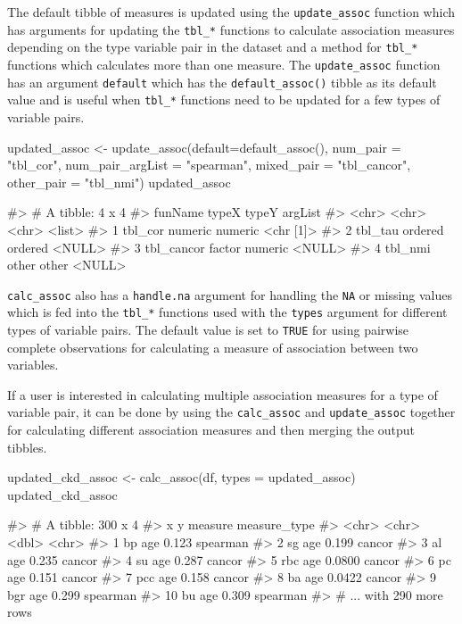 The default tibble of measures is updated using the
\texttt{update\_assoc} function which has arguments for updating the
\texttt{tbl\_*} functions to calculate association measures depending on
the type variable pair in the dataset and a method for \texttt{tbl\_*}
functions which calculates more than one measure. The
\texttt{update\_assoc} function has an argument \texttt{default} which
has the \texttt{default\_assoc()} tibble as its default value and is
useful when \texttt{tbl\_*} functions need to be updated for a few types
of variable pairs.

\begin{Schunk}
\begin{Sinput}
updated_assoc <- update_assoc(default=default_assoc(),
                              num_pair = "tbl_cor",
                              num_pair_argList = "spearman",
                              mixed_pair = "tbl_cancor",
                              other_pair = "tbl_nmi")
updated_assoc
\end{Sinput}
\begin{Soutput}
#> # A tibble: 4 x 4
#>   funName    typeX   typeY   argList  
#>   <chr>      <chr>   <chr>   <list>   
#> 1 tbl_cor    numeric numeric <chr [1]>
#> 2 tbl_tau    ordered ordered <NULL>   
#> 3 tbl_cancor factor  numeric <NULL>   
#> 4 tbl_nmi    other   other   <NULL>
\end{Soutput}
\end{Schunk}

\texttt{calc\_assoc} also has a \texttt{handle.na} argument for handling
the \texttt{NA} or missing values which is fed into the \texttt{tbl\_*}
functions used with the \texttt{types} argument for different types of
variable pairs. The default value is set to \texttt{TRUE} for using
pairwise complete observations for calculating a measure of association
between two variables.

If a user is interested in calculating multiple association measures for
a type of variable pair, it can be done by using the
\texttt{calc\_assoc} and \texttt{update\_assoc} together for calculating
different association measures and then merging the output tibbles.

\begin{Schunk}
\begin{Sinput}
updated_ckd_assoc <- calc_assoc(df, types = updated_assoc)
updated_ckd_assoc
\end{Sinput}
\begin{Soutput}
#> # A tibble: 300 x 4
#>    x     y     measure measure_type
#>    <chr> <chr>   <dbl> <chr>       
#>  1 bp    age    0.123  spearman    
#>  2 sg    age    0.199  cancor      
#>  3 al    age    0.235  cancor      
#>  4 su    age    0.287  cancor      
#>  5 rbc   age    0.0800 cancor      
#>  6 pc    age    0.151  cancor      
#>  7 pcc   age    0.158  cancor      
#>  8 ba    age    0.0422 cancor      
#>  9 bgr   age    0.299  spearman    
#> 10 bu    age    0.309  spearman    
#> # ... with 290 more rows
\end{Soutput}
\end{Schunk}

